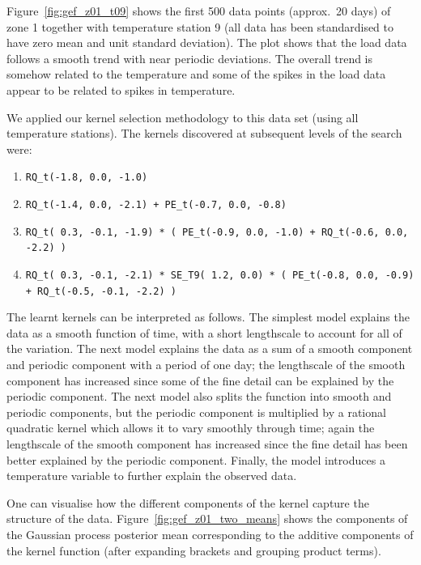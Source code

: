 \documentclass[twoside]{article}
\begin{document}
Figure~\ref{fig:gef_z01_t09} shows the first 500 data points (approx.~20 days) of zone 1 together with temperature station 9 (all data has been standardised to have zero mean and unit standard deviation).
The plot shows that the load data follows a smooth trend with near periodic deviations.
The overall trend is somehow related to the temperature and some of the spikes in the load data appear to be related to spikes in temperature.

We applied our kernel selection methodology to this data set (using all temperature stations).
The kernels discovered at subsequent levels of the search were:
\begin{enumerate}
\item \texttt{RQ\_t(-1.8,  0.0, -1.0)}
\item \texttt{RQ\_t(-1.4,  0.0, -2.1) + PE\_t(-0.7,  0.0, -0.8)}
\item \texttt{RQ\_t( 0.3, -0.1, -1.9) * ( PE\_t(-0.9,  0.0, -1.0) + RQ\_t(-0.6,  0.0, -2.2) )}
\item \texttt{RQ\_t( 0.3, -0.1, -2.1) * SE\_T9( 1.2,  0.0) * ( PE\_t(-0.8,  0.0, -0.9) + RQ\_t(-0.5, -0.1, -2.2) )}
\end{enumerate}
The learnt kernels can be interpreted as follows.
The simplest model explains the data as a smooth function of time, with a short lengthscale to account for all of the variation.
The next model explains the data as a sum of a smooth component and periodic component with a period of one day; the lengthscale of the smooth component has increased since some of the fine detail can be explained by the periodic component.
The next model also splits the function into smooth and periodic components, but the periodic component is multiplied by a rational quadratic kernel which allows it to vary smoothly through time; again the lengthscale of the smooth component has increased since the fine detail has been better explained by the periodic component.
Finally, the model introduces a temperature variable to further explain the observed data.

One can visualise how the different components of the kernel capture the structure of the data.
Figure~\ref{fig:gef_z01_two_means} shows the components of the Gaussian process posterior mean corresponding to the additive components of the kernel function (after expanding brackets and grouping product terms).
\end{document}
